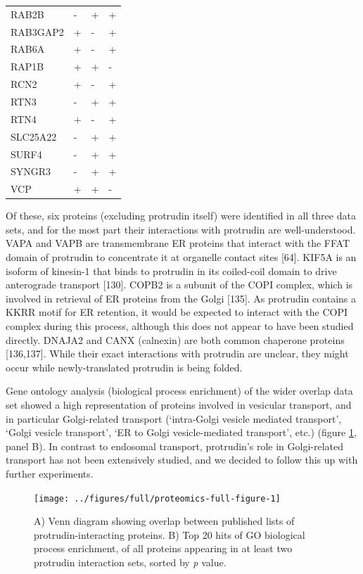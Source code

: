 \documentclass[
  12pt,
  a4paper,
]{book}
\begin{document}
\begin{longtable}[]{@{}llll@{}}
RAB2B & - & + & + \\
RAB3GAP2 & + & - & + \\
RAB6A & + & - & + \\
RAP1B & + & + & - \\
RCN2 & + & - & + \\
RTN3 & - & + & + \\
RTN4 & + & - & + \\
SLC25A22 & - & + & + \\
SURF4 & - & + & + \\
SYNGR3 & - & + & + \\
VCP & + & + & - \\
\bottomrule()
\end{longtable}

Of these, six proteins (excluding protrudin itself) were identified in all three data sets, and for the most part their interactions with protrudin are well-understood. VAPA and VAPB are transmembrane ER proteins that interact with the FFAT domain of protrudin to concentrate it at organelle contact sites {[}64{]}. KIF5A is an isoform of kinesin-1 that binds to protrudin in its coiled-coil domain to drive anterograde transport {[}130{]}. COPB2 is a subunit of the COPI complex, which is involved in retrieval of ER proteins from the Golgi {[}135{]}. As protrudin contains a KKRR motif for ER retention, it would be expected to interact with the COPI complex during this process, although this does not appear to have been studied directly. DNAJA2 and CANX (calnexin) are both common chaperone proteins {[}136,137{]}. While their exact interactions with protrudin are unclear, they might occur while newly-translated protrudin is being folded.

Gene ontology analysis (biological process enrichment) of the wider overlap data set showed a high representation of proteins involved in vesicular transport, and in particular Golgi-related transport (`intra-Golgi vesicle mediated transport', `Golgi vesicle transport', `ER to Golgi vesicle-mediated transport', etc.) (figure \ref{fig:proteomics-full-figure}, panel B). In contrast to endosomal transport, protrudin's role in Golgi-related transport has not been extensively studied, and we decided to follow this up with further experiments.



\begin{figure}
\texttt{[image: ../figures/full/proteomics-full-figure-1]} \caption[Data set comparison and gene ontology of conserved protrudin-interacting proteins]{A) Venn diagram showing overlap between published lists of protrudin-interacting proteins. B) Top 20 hits of GO biological process enrichment, of all proteins appearing in at least two protrudin interaction sets, sorted by \emph{p} value.}\label{fig:proteomics-full-figure}
\end{figure}
\end{document}
